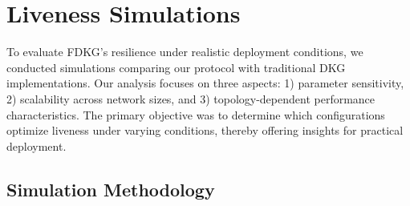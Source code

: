 \documentclass[lettersize,journal]{IEEEtran}
\theoremstyle{definition}
\begin{document}



\section{Liveness Simulations}
\label{sec:liveness_simulations}

To evaluate FDKG's resilience under realistic deployment conditions, we conducted simulations comparing our protocol with traditional DKG implementations. Our analysis focuses on three aspects: 1) parameter sensitivity, 2) scalability across network sizes, and 3) topology-dependent performance characteristics. The primary objective was to determine which configurations optimize liveness under varying conditions, thereby offering insights for practical deployment.

\subsection{Simulation Methodology}
\label{subsec:methodology}
\end{document}
